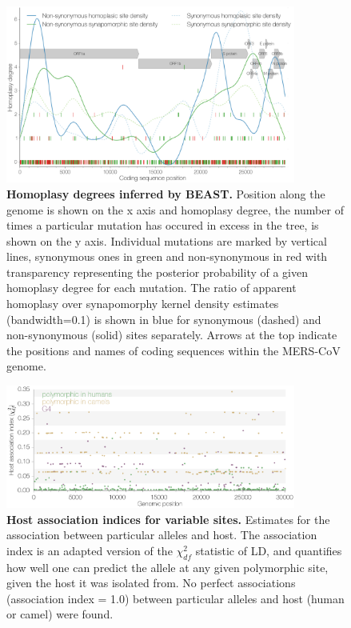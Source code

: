 \documentclass[11pt,oneside,letterpaper]{article}
\begin{document}
\begin{figure}[h]
	\centering	
	\includegraphics[width=0.85\textwidth]{figures/supp_MERS_BEAST_homoplasyRate.png}
	\caption{\textbf{Homoplasy degrees inferred by BEAST.}
Position along the genome is shown on the x axis and homoplasy degree, the number of times a particular mutation has occured in excess in the tree, is shown on the y axis.
Individual mutations are marked by vertical lines, synonymous ones in green and non-synonymous in red with transparency representing the posterior probability of a given homoplasy degree for each mutation.
The ratio of apparent homoplasy over synapomorphy kernel density estimates (bandwidth=0.1) is shown in blue for synonymous (dashed) and non-synonymous (solid) sites separately.
Arrows at the top indicate the positions and names of coding sequences within the MERS-CoV genome.}
	\label{homoplasyRates_Bayesian}
\end{figure}

\begin{figure}[h]
	\centering	
	\includegraphics[width=0.85\textwidth]{figures/supp_MERS_hostAssociation.png}
	\caption{\textbf{Host association indices for variable sites.}
Estimates for the association between particular alleles and host.
The association index is an adapted version of the $\chi^{2}_{df}$ statistic of LD, and quantifies how well one can predict the allele at any given polymorphic site, given the host it was isolated from.
No perfect associations (association index = 1.0) between particular alleles and host (human or camel) were found.}
	\label{host_association}
\end{figure}
\end{document}
